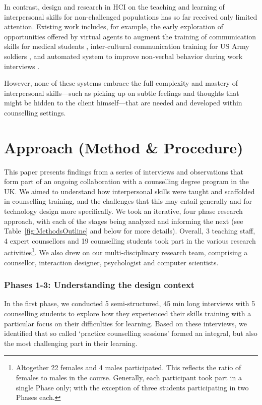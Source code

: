 \documentclass{sigchi}
\begin{document}
In contrast, design and research in HCI on the teaching and learning of interpersonal skills for non-challenged populations has so far received only limited attention. Existing work includes, for example, the early exploration of opportunities offered by virtual agents to augment the training of communication skills for medical students \cite{Johnsen2007}, inter-cultural communication training for US Army soldiers \cite{Core2006}, and automated system to improve non-verbal behavior during work interviews \cite{Hoque2013}. 

However, none of these systems embrace the full complexity and mastery of interpersonal skills---such as picking up on subtle feelings and thoughts that might be hidden to the client himself---that are needed and developed within counselling settings.



\section{Approach (Method \& Procedure)}
This paper presents findings from a series of interviews and observations that form part of an ongoing collaboration with a counselling degree program in the UK. We aimed to understand how interpersonal skills were taught and scaffolded in counselling training, and the challenges that this may entail generally and for technology design more specifically. We took an iterative, four phase research approach, with each of the stages being analyzed and informing the next (see Table~\ref{fig:MethodsOutline} and below for more details). Overall, 3 teaching staff, 4 expert counsellors and 19 counselling students took part in the various research activities\footnote{Altogether 22 females and 4 males participated. This reflects the ratio of females to males in the course. Generally, each participant took part in a single Phase only; with the exception of three students participating in two Phases each.}. We also drew on our multi-disciplinary research team, comprising a counsellor, interaction designer, psychologist and computer scientists. 


\subsubsection{Phases 1-3: Understanding the design context} 	
In the first phase, we conducted 5 semi-structured, 45 min long interviews with 5 counselling students to explore how they experienced their skills training with a particular focus on their difficulties for learning.  Based on these interviews, we identified that so called `practice counselling sessions' formed an integral, but also the most challenging part in their learning. 
\end{document}

